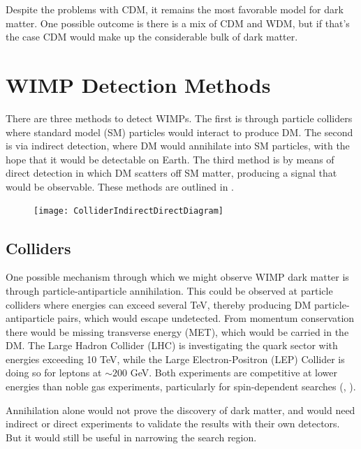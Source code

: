 Despite the problems with CDM, it remains the most favorable model for dark matter.  One possible outcome is
there is a mix of CDM and WDM, but if that's the case CDM would make up the considerable bulk of dark matter.


\section[WIMP Detection Methods][WIMP Detection Methods]{WIMP Detection Methods}
\label{sec:detection}

There are three methods to detect WIMPs.  The first is through particle colliders where standard model (SM) particles would interact to
produce DM.  The second is via indirect detection, where DM would annihilate into SM particles, with the hope that it would be detectable
on Earth.  The third method is by means of direct detection in which DM scatters off SM matter, producing a signal that would be
observable.  These methods are outlined in .

\begin{figure}
\centering
\texttt{[image: ColliderIndirectDirectDiagram]}
\label{fig:detection_methods}
\end{figure}

\subsection{Colliders} \label{subsec:colliders}
One possible mechanism through which we might observe WIMP dark matter is through particle-antiparticle
annihilation.  This could be observed at particle colliders where energies can exceed
several TeV, thereby producing DM particle-antiparticle pairs, which
would escape undetected.  From momentum conservation there would be missing transverse energy (MET),
which would be carried in the DM.  The Large Hadron Collider (LHC) is investigating the quark sector with energies
exceeding 10 TeV, while the Large Electron-Positron (LEP) Collider is doing so for leptons at
$\sim 200$ GeV.  Both experiments are competitive at lower energies than noble gas experiments, particularly
for spin-dependent searches (, ).

Annihilation alone would not prove the discovery of dark matter, and would need
indirect or direct experiments to validate the results with their own detectors.  But
it would still be useful in narrowing the search region.

